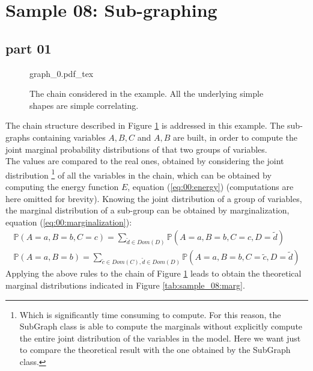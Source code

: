 
\section{Sample 08: Sub-graphing}

\subsection{part 01}

\begin{figure}
	\centering
\def\svgwidth{0.5 \textwidth}
{graph_0.pdf_tex} 
\caption{The chain considered in the example. All the underlying simple shapes are simple correlating. }
\label{fig:sample_08:00}
\end{figure}

The chain structure described in Figure \ref{fig:sample_08:00} is addressed in this example.
The sub-graphs containing variables $A,B,C$ and $A,B$ are built, in order to compute the joint marginal probability distributions of that two groups of variables.
\\
The values are compared to the real ones, obtained by considering the joint distribution \footnote{Which is significantly time consuming to compute. For this reason, the SubGraph class is able to compute the marginals without explicitly compute the entire joint distribution of the variables in the model. Here we want just to compare the theoretical result with the one obtained by the SubGraph class.} of all the variables in the chain, which can be obtained by computing the energy function $E$, equation (\ref{eq:00:energy}) (computations are here omitted for brevity).
Knowing the joint distribution of a group of variables, the marginal distribution of a sub-group can be obtained by marginalization, equation (\ref{eq:00:marginalization}):
\begin{eqnarray}
\mathbb{P}(A=a, B=b, C=c) = \sum_{\tilde{d} \in Dom(D)} \mathbb{P}( A =a, B=b, C = c,D= \tilde{d} ) \nonumber\\
\mathbb{P}(A=a, B=b) = \sum_{\tilde{c} \in Dom(C), \tilde{d} \in Dom(D)} \mathbb{P}( A =a, B=b, C = \tilde{c},D= \tilde{d} )
\end{eqnarray}
Applying the above rules to the chain of Figure \ref{fig:sample_08:00} leads to obtain the theoretical marginal distributions indicated in Figure \ref{tab:sample_08:marg}.

